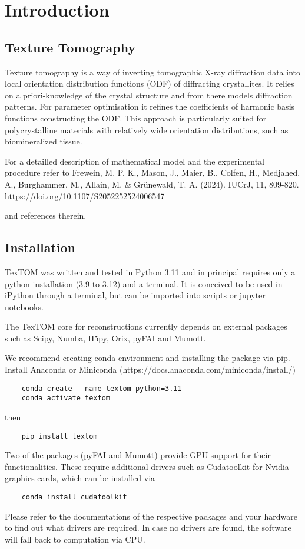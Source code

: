 \section{Introduction}

\subsection{Texture Tomography}
Texture tomography is a way of inverting tomographic X-ray diffraction data into local
orientation distribution functions (ODF) of diffracting crystallites.
It relies on a priori-knowledge of the crystal structure and from there
models diffraction patterns. For parameter optimisation it refines
the coefficients of harmonic basis functions constructing the ODF.
This approach is particularly suited for polycrystalline materials
with relatively wide orientation distributions, such as biomineralized tissue.

For a detailled description of mathematical model and the experimental procedure
refer to 
Frewein, M. P. K., Mason, J., Maier, B., Colfen, H., Medjahed, A., Burghammer, 
M., Allain, M. \& Grünewald, T. A. (2024). IUCrJ, 11, 809-820. https://doi.org/10.1107/S2052252524006547

and references therein.

\subsection{Installation}

TexTOM was written and tested in Python 3.11 and in principal requires only a python installation (3.9 to 3.12) and a terminal.
It is conceived to be used in iPython through a terminal, but can be imported into scripts or jupyter notebooks.

The TexTOM core for reconstructions currently depends on external packages such as Scipy, Numba, H5py, Orix, pyFAI and Mumott.

We recommend creating conda environment and installing the package via pip.
Install Anaconda or Miniconda (https://docs.anaconda.com/miniconda/install/) 
\begin{verbatim}
    conda create --name textom python=3.11
    conda activate textom
\end{verbatim}
then
\begin{verbatim}
    pip install textom
\end{verbatim}

Two of the packages (pyFAI and Mumott) provide GPU support for their functionalities.
These require additional drivers such as Cudatoolkit for Nvidia graphics cards, which
can be installed via 
\begin{verbatim}
    conda install cudatoolkit
\end{verbatim}
Please refer to the documentations of the respective packages and your hardware
to find out what drivers are required.
In case no drivers are found, the software will fall back to computation via CPU.

